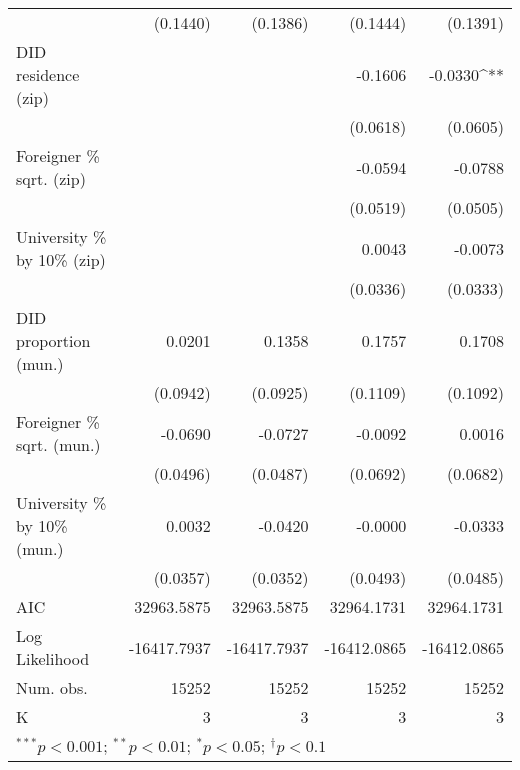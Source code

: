\begin{tabular}{l D{.}{.}{6.11} D{.}{.}{6.11} D{.}{.}{6.11} D{.}{.}{6.11}}
                                  & (0.1440)         & (0.1386)          & (0.1444)         & (0.1391)          \\
DID residence (zip)               &                  &                   & -0.1606          & -0.0330^{**}      \\
                                  &                  &                   & (0.0618)         & (0.0605)          \\
Foreigner \% sqrt. (zip)          &                  &                   & -0.0594          & -0.0788           \\
                                  &                  &                   & (0.0519)         & (0.0505)          \\
University \% by 10\% (zip)       &                  &                   & 0.0043           & -0.0073           \\
                                  &                  &                   & (0.0336)         & (0.0333)          \\
DID proportion (mun.)             & 0.0201           & 0.1358            & 0.1757           & 0.1708            \\
                                  & (0.0942)         & (0.0925)          & (0.1109)         & (0.1092)          \\
Foreigner \% sqrt. (mun.)         & -0.0690          & -0.0727           & -0.0092          & 0.0016            \\
                                  & (0.0496)         & (0.0487)          & (0.0692)         & (0.0682)          \\
University \% by 10\% (mun.)      & 0.0032           & -0.0420           & -0.0000          & -0.0333           \\
                                  & (0.0357)         & (0.0352)          & (0.0493)         & (0.0485)          \\
\midrule
AIC                               & 32963.5875       & 32963.5875        & 32964.1731       & 32964.1731        \\
Log Likelihood                    & -16417.7937      & -16417.7937       & -16412.0865      & -16412.0865       \\
Num. obs.                         & 15252            & 15252             & 15252            & 15252             \\
K                                 & 3                & 3                 & 3                & 3                 \\
\bottomrule
{}
\end{tabular}
